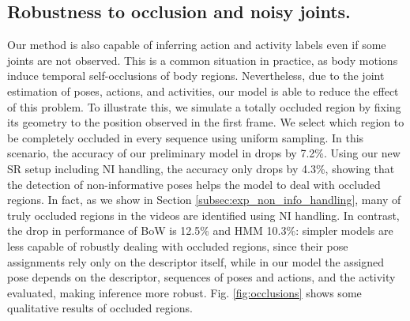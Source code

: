 \subsection{Robustness to occlusion and noisy joints.}
Our method is also capable of inferring action and activity labels even if some
joints are not observed. This is a common situation in practice,
as body motions induce temporal self-occlusions of body regions.
Nevertheless, due to the joint estimation of poses, actions, and activities,
our model is able to reduce the effect of this problem. To illustrate this, we
simulate a totally occluded region by fixing its geometry to the position
observed in the first frame.
We select which region to be completely occluded in every sequence using uniform sampling.
In this scenario, the accuracy of our preliminary model in \cite{Lillo2014} drops
by 7.2\%. Using our new SR setup including NI handling, the accuracy only drops
by 4.3\%, showing that the detection of non-informative poses helps the model
to deal with occluded regions. In fact, as we show in Section
\ref{subsec:exp_non_info_handling}, many of truly occluded regions in the
videos are identified using NI handling. In contrast, the drop in performance of
BoW is 12.5\% and HMM 10.3\%: simpler models are less capable of robustly dealing
with occluded regions, since their pose assignments rely only on the descriptor
itself, while in our model the assigned pose depends on the descriptor,
sequences of poses and actions, and the activity evaluated, making inference
more robust. Fig. \ref{fig:occlusions} shows some qualitative results of
occluded regions.


